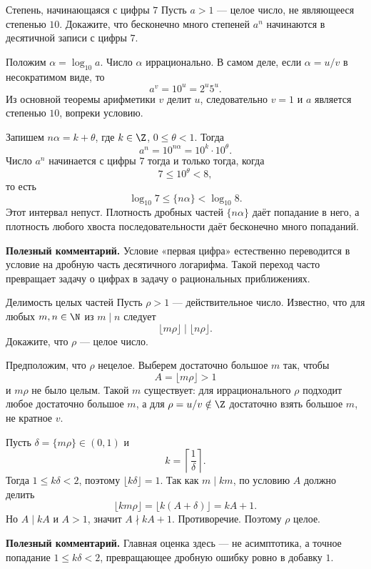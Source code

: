 \begin{problembox}{Степень, начинающаяся с цифры $7$}
Пусть $a>1$ --- целое число, не являющееся степенью $10$. Докажите,
что бесконечно много степеней $a^n$ начинаются в десятичной записи
с цифры $7$.
\end{problembox}

\begin{solutionbox}
Положим $\alpha=\log_{10}a$. Число $\alpha$ иррационально. В самом
деле, если $\alpha=u/v$ в несократимом виде, то
\[
  a^v=10^u=2^u5^u.
\]
Из основной теоремы арифметики $v$ делит $u$, следовательно $v=1$ и
$a$ является степенью $10$, вопреки условию.

Запишем $n\alpha=k+\theta$, где $k\in\Z$, $0\le\theta<1$. Тогда
\[
  a^n=10^{n\alpha}=10^k\cdot10^\theta.
\]
Число $a^n$ начинается с цифры $7$ тогда и только тогда, когда
\[
  7\le10^\theta<8,
\]
то есть
\[
  \log_{10}7\le\{n\alpha\}<\log_{10}8.
\]
Этот интервал непуст. Плотность дробных частей $\{n\alpha\}$ даёт
попадание в него, а плотность любого хвоста последовательности даёт
бесконечно много попаданий.

\textbf{Полезный комментарий.}
Условие «первая цифра» естественно переводится в условие на дробную
часть десятичного логарифма. Такой переход часто превращает задачу
о цифрах в задачу о рациональных приближениях.
\end{solutionbox}

\begin{problembox}{Делимость целых частей}
Пусть $\rho>1$ --- действительное число. Известно, что для любых
$m,n\in\N$ из $m\mid n$ следует
\[
  \lfloor m\rho\rfloor\mid\lfloor n\rho\rfloor.
\]
Докажите, что $\rho$ --- целое число.
\end{problembox}

\begin{solutionbox}
Предположим, что $\rho$ нецелое. Выберем достаточно большое $m$ так,
чтобы
\[
  A=\lfloor m\rho\rfloor>1
\]
и $m\rho$ не было целым. Такой $m$ существует: для иррационального
$\rho$ подходит любое достаточно большое $m$, а для
$\rho=u/v\notin\Z$ достаточно взять большое $m$, не кратное $v$.

Пусть $\delta=\{m\rho\}\in(0,1)$ и
\[
  k=\left\lceil\frac1\delta\right\rceil.
\]
Тогда $1\le k\delta<2$, поэтому $\lfloor k\delta\rfloor=1$. Так как
$m\mid km$, по условию $A$ должно делить
\[
  \lfloor km\rho\rfloor
  =\lfloor k(A+\delta)\rfloor
  =kA+1.
\]
Но $A\mid kA$ и $A>1$, значит $A\nmid kA+1$. Противоречие. Поэтому
$\rho$ целое.

\textbf{Полезный комментарий.}
Главная оценка здесь --- не асимптотика, а точное попадание
$1\le k\delta<2$, превращающее дробную ошибку ровно в добавку $1$.
\end{solutionbox}

